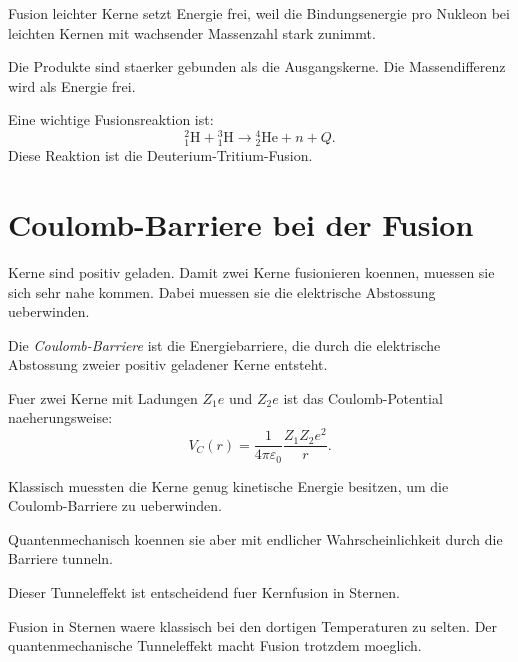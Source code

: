 \begin{conceptbox}
Fusion leichter Kerne setzt Energie frei, weil die Bindungsenergie pro Nukleon
bei leichten Kernen mit wachsender Massenzahl stark zunimmt.

Die Produkte sind staerker gebunden als die Ausgangskerne.
Die Massendifferenz wird als Energie frei.
\end{conceptbox}

\begin{examplebox}
Eine wichtige Fusionsreaktion ist:
\[
    {}^{2}_{1}\mathrm{H}
    +
    {}^{3}_{1}\mathrm{H}
    \rightarrow
    {}^{4}_{2}\mathrm{He}
    +
    n
    +
    Q.
\]
Diese Reaktion ist die Deuterium-Tritium-Fusion.
\end{examplebox}

\section{Coulomb-Barriere bei der Fusion}

Kerne sind positiv geladen.
Damit zwei Kerne fusionieren koennen, muessen sie sich sehr nahe kommen.
Dabei muessen sie die elektrische Abstossung ueberwinden.

\begin{definitionbox}
Die \emph{Coulomb-Barriere} ist die Energiebarriere, die durch die elektrische
Abstossung zweier positiv geladener Kerne entsteht.
\end{definitionbox}

\begin{formulabox}
Fuer zwei Kerne mit Ladungen $Z_1e$ und $Z_2e$ ist das Coulomb-Potential
naeherungsweise:
\[
    V_C(r)
    =
    \frac{1}{4\pi\varepsilon_0}
    \frac{Z_1Z_2e^2}{r}.
\]
\end{formulabox}

\begin{conceptbox}
Klassisch muessten die Kerne genug kinetische Energie besitzen, um die Coulomb-Barriere
zu ueberwinden.

Quantenmechanisch koennen sie aber mit endlicher Wahrscheinlichkeit durch die Barriere
tunneln.

Dieser Tunneleffekt ist entscheidend fuer Kernfusion in Sternen.
\end{conceptbox}

\begin{examtipbox}
Fusion in Sternen waere klassisch bei den dortigen Temperaturen zu selten.
Der quantenmechanische Tunneleffekt macht Fusion trotzdem moeglich.
\end{examtipbox}

